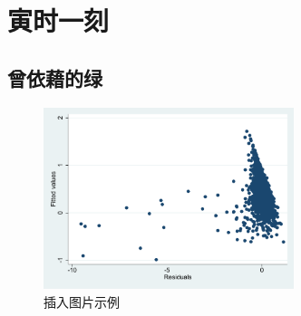 \documentclass[a4paper,12pt]{report}
\begin{document}
\chapter{寅时一刻}
\section{曾依藉的绿}
\begin{figure}[H]
    \centering
    \includegraphics[width=0.65\textwidth]{figure/cancha.pdf}
    \caption{插入图片示例}
\end{figure}
\end{document}
